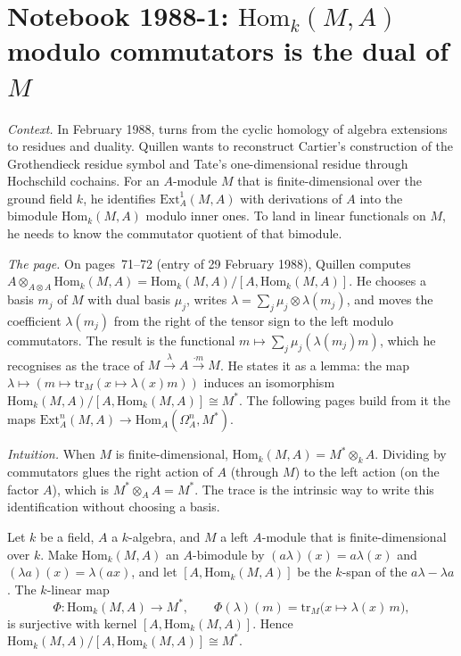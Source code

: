 \section[Notebook 1988-1: $\mathrm{Hom}_k(M, A)$ modulo commutators is the dual of $M$]{Notebook 1988-1: $\mathrm{Hom}_k(M, A)$ modulo commutators is the dual of $M$\protect{}}\label{sec:quillen-1988-1}

\emph{Context.} In February 1988,  turns from the cyclic homology of algebra extensions to residues and duality. Quillen wants to reconstruct Cartier's construction of the Grothendieck residue symbol and Tate's one-dimensional residue through Hochschild cochains. For an $A$-module $M$ that is finite-dimensional over the ground field $k$, he identifies $\mathrm{Ext}^1_A(M, A)$ with derivations of $A$ into the bimodule $\mathrm{Hom}_k(M, A)$ modulo inner ones. To land in linear functionals on $M$, he needs to know the commutator quotient of that bimodule.

\emph{The page.} On pages~71--72 (entry of 29 February 1988), Quillen computes $A \otimes_{A \otimes A} \mathrm{Hom}_k(M, A) = \mathrm{Hom}_k(M, A)/[A, \mathrm{Hom}_k(M, A)]$. He chooses a basis $m_j$ of $M$ with dual basis $\mu_j$, writes $\lambda = \sum_j \mu_j \otimes \lambda(m_j)$, and moves the coefficient $\lambda(m_j)$ from the right of the tensor sign to the left modulo commutators. The result is the functional $m \mapsto \sum_j \mu_j(\lambda(m_j) m)$, which he recognises as the trace of $M \xrightarrow{\lambda} A \xrightarrow{\cdot m} M$. He states it as a lemma: the map $\lambda \mapsto (m \mapsto \mathrm{tr}_M(x \mapsto \lambda(x) m))$ induces an isomorphism $\mathrm{Hom}_k(M, A)/[A, \mathrm{Hom}_k(M, A)] \cong M^*$. The following pages build from it the maps $\mathrm{Ext}^n_A(M, A) \to \mathrm{Hom}_A(\Omega^n_A, M^*)$.

\emph{Intuition.} When $M$ is finite-dimensional, $\mathrm{Hom}_k(M, A) = M^* \otimes_k A$. Dividing by commutators glues the right action of $A$ (through $M$) to the left action (on the factor $A$), which is $M^* \otimes_A A = M^*$. The trace is the intrinsic way to write this identification without choosing a basis.

\begin{encadre}
\begin{theoreme}\label{thm:quillen-1988-1}
Let $k$ be a field, $A$ a $k$-algebra, and $M$ a left $A$-module that is finite-dimensional over $k$. Make $\mathrm{Hom}_k(M, A)$ an $A$-bimodule by $(a\lambda)(x) = a\lambda(x)$ and $(\lambda a)(x) = \lambda(ax)$, and let $[A, \mathrm{Hom}_k(M, A)]$ be the $k$-span of the $a\lambda - \lambda a$. The $k$-linear map
\[
  \Phi : \mathrm{Hom}_k(M, A) \to M^*, \qquad \Phi(\lambda)(m) = \mathrm{tr}_M\bigl(x \mapsto \lambda(x)\, m\bigr),
\]
is surjective with kernel $[A, \mathrm{Hom}_k(M, A)]$. Hence $\mathrm{Hom}_k(M, A)/[A, \mathrm{Hom}_k(M, A)] \cong M^*$.
\end{theoreme}
\end{encadre}

